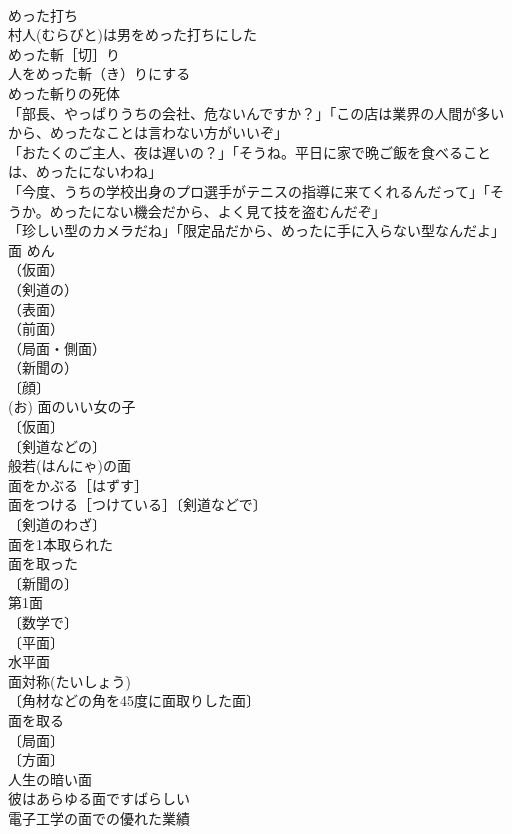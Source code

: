 \documentclass[8pt]{extreport}
\begin{document}
\begin{CJK}{UTF8}{min}
\\	めった打ち 
\\	村人(むらびと)は男をめった打ちにした 
\\	めった斬［切］り 
\\	人をめった斬（き）りにする 
\\	めった斬りの死体 
\\	「部長、やっぱりうちの会社、危ないんですか？」「この店は業界の人間が多いから、めったなことは言わない方がいいぞ」 
\\	「おたくのご主人、夜は遅いの？」「そうね。平日に家で晩ご飯を食べることは、めったにないわね」 
\\	「今度、うちの学校出身のプロ選手がテニスの指導に来てくれるんだって」「そうか。めったにない機会だから、よく見て技を盗むんだぞ」 
\\	「珍しい型のカメラだね」「限定品だから、めったに手に入らない型なんだよ」 
\\	面	めん	
\\	（仮面）
\\	（剣道の）
\\	（表面）
\\	（前面）
\\	（局面・側面）
\\	（新聞の）
\\	〔顔〕
\\	(お) 面のいい女の子 
\\	〔仮面〕
\\	〔剣道などの〕
\\	般若(はんにゃ)の面 
\\	面をかぶる［はずす］ 
\\	面をつける［つけている］〔剣道などで〕 
\\	〔剣道のわざ〕
\\	面を1本取られた 
\\	面を取った 
\\	〔新聞の〕
\\	第1面 
\\	〔数学で〕
\\	〔平面〕
\\	水平面 
\\	面対称(たいしょう) 
\\	〔角材などの角を45度に面取りした面〕
\\	面を取る 
\\	〔局面〕
\\	〔方面〕
\\	人生の暗い面 
\\	彼はあらゆる面ですばらしい 
\\	電子工学の面での優れた業績 

\end{CJK}
\end{document}
